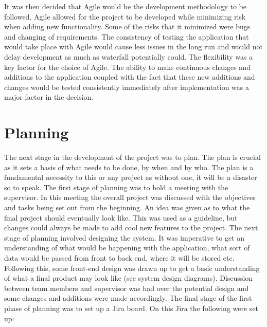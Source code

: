 It was then decided that Agile would be the development methodology to be followed. Agile allowed for the project to be developed while minimizing risk when adding new functionality. Some of the risks that it minimized were bugs and changing of requirements. The consistency of testing the application that would take place with Agile would cause less issues in the long run and would not delay development as much as waterfall potentially could. The flexibility was a key factor for the choice of Agile. The ability to make continuous changes and additions to the application coupled with the fact that these new additions and changes would be tested consistently immediately after implementation was a major factor in the decision. \\

\section{Planning}

The next stage in the development of the project was to plan. The plan is crucial as it sets a basis of what needs to be done, by when and by who. The plan is a fundamental necessity to this or any project as without one, it will be a disaster so to speak. The first stage of planning was to hold a meeting with the supervisor. In this meeting the overall project was discussed with the objectives and tasks being set out from the beginning. An idea was given as to what the final project should eventually look like. This was used as a guideline, but changes could always be made to add cool new features to the project. The next stage of planning involved designing the system. It was imperative to get an understanding of what would be happening with the application, what sort of data would be passed from front to back end, where it will be stored etc. Following this, some front-end design was drawn up to get a basic understanding of what a final product may look like (see system design diagrams). Discussion between team members and supervisor was had over the potential design and some changes and additions were made accordingly. The final stage of the first phase of planning was to set up a Jira board. On this Jira the following were set up: 

